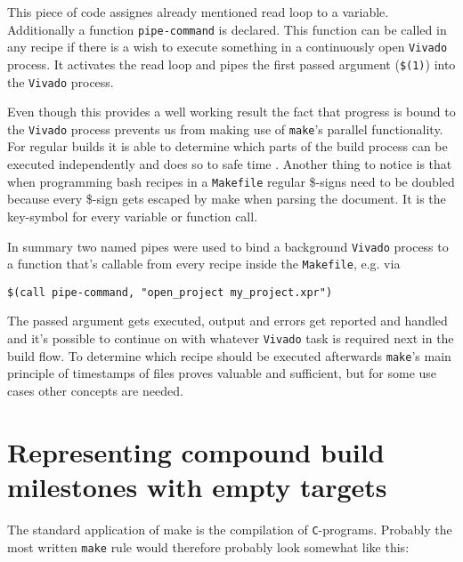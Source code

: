 This piece of code assignes already mentioned read loop to a variable. Additionally a function \texttt{pipe-command} is declared. This function can be called in any recipe if there is a wish to execute something in a continuously open \texttt{Vivado} process. It activates the read loop and pipes the first passed argument (\texttt{\$(1)}) into the \texttt{Vivado} process. 

Even though this provides a well working result the fact that progress is bound to the \texttt{Vivado} process prevents us from making use of \texttt{make}'s parallel functionality. For regular builds it is able to determine which parts of the build process can be executed independently and does so to safe time \cite[see][p. 47]{Make16}. Another thing to notice is that when programming bash recipes in a \texttt{Makefile} regular \$-signs need to be doubled because every \$-sign gets escaped by make when parsing the document. It is the key-symbol for every variable or function call.

In summary two named pipes were used to bind a background \texttt{Vivado} process to a function that's callable from every recipe inside the \texttt{Makefile}, e.g. via
\begin{lstlisting}[language={[gnu] make}]
$(call pipe-command, "open_project my_project.xpr")
\end{lstlisting}
\noindent
The passed argument gets executed, output and errors get reported and handled and it's possible to continue on with whatever \texttt{Vivado} task is required next in the build flow. To determine which recipe should be executed afterwards \texttt{make}'s main principle of timestamps of files proves valuable and sufficient, but for some use cases other concepts are needed.

\section{Representing compound build milestones with empty targets}

The standard application of make is the compilation of \texttt{C}-programs. Probably the most written \texttt{make} rule would therefore probably look somewhat like this:


